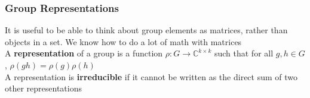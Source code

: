 \documentclass{beamer} %
\theoremstyle{definition} %
\def \pausenl {\pause $ \ $\\}
\begin{document}
	\begin{frame}
		
		\frametitle{Group Representations}
		
		It is useful to be able to think about group elements as matrices, rather than objects in a set.
		\pause
		We know how to do a lot of math with matrices\\
		
		\pausenl
		
		A \textbf{representation} of a group is a function $\rho : G \rightarrow \mathbb{C}^{k\times k}$ such that for all $g,h\in G$, $\rho(gh) = \rho(g)\rho(h)$\\
		
		\pausenl
		
		A representation is \textbf{irreducible} if it cannot be written as the direct sum of two other representations
		
		
	\end{frame}
	
\end{document}
